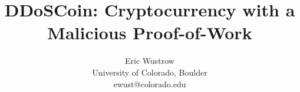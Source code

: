 \documentclass[letterpaper,twocolumn,10pt]{article}
\begin{document}
\title{DDoSCoin: Cryptocurrency with a Malicious Proof-of-Work}

\author{\rm{Eric Wustrow}\\
University of Colorado, Boulder\\
{\small ewust@colorado.edu}
}

\maketitle
\end{document}
